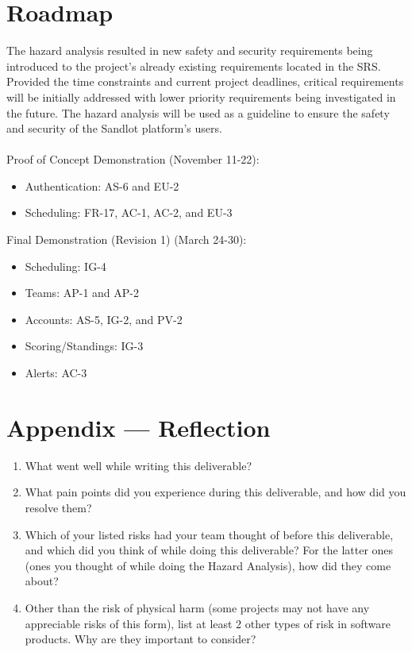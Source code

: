 \documentclass{article}
\begin{document}
\section{Roadmap}

The hazard analysis resulted in new safety and security requirements being
introduced to the project's already existing requirements located in the
SRS. Provided the time constraints and current project deadlines, critical
requirements will be initially addressed with lower priority requirements
being investigated in the future. The hazard analysis will be used as a guideline
to ensure the safety and security of the Sandlot platform's users.\\\\

Proof of Concept Demonstration (November 11-22):
\begin{itemize}
  \item Authentication: AS-6 and EU-2
  \item Scheduling: FR-17, AC-1, AC-2, and EU-3
\end{itemize}

Final Demonstration (Revision 1) (March 24-30):
\begin{itemize}
  \item Scheduling: IG-4
  \item Teams: AP-1 and AP-2
  \item Accounts: AS-5, IG-2, and PV-2
  \item Scoring/Standings: IG-3
  \item Alerts: AC-3
\end{itemize}

\newpage{}

\section*{Appendix --- Reflection}



\begin{enumerate}
    \item What went well while writing this deliverable? 
    \item What pain points did you experience during this deliverable, and how
    did you resolve them?
    \item Which of your listed risks had your team thought of before this
    deliverable, and which did you think of while doing this deliverable? For
    the latter ones (ones you thought of while doing the Hazard Analysis), how
    did they come about?
    \item Other than the risk of physical harm (some projects may not have any
    appreciable risks of this form), list at least 2 other types of risk in
    software products. Why are they important to consider?
\end{enumerate}
\end{document}
